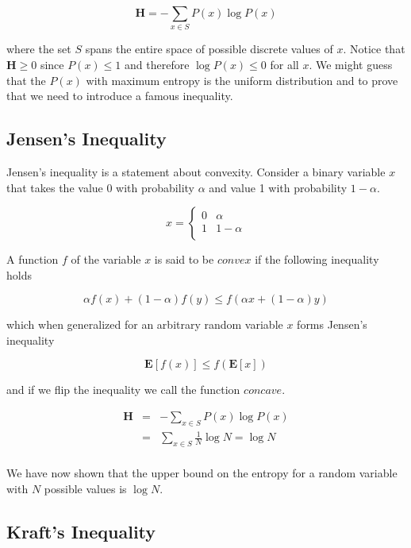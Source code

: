 \documentclass[a4paper,11pt]{book}
\begin{document}
\begin{equation}
\textbf{H} = -\sum_{x\in S} P(x)\log P(x)
\end{equation}

where the set $S$ spans the entire space of possible discrete values of $x$. Notice that $\mathbf{H} \geq 0$ since $P(x) \leq 1$ and therefore $\log P(x) \leq 0$  for all $x$. We might guess that the $P(x)$ with maximum entropy is the uniform distribution and to prove that we need to introduce a famous inequality.

\subsection{Jensen's Inequality}

Jensen's inequality is a statement about convexity. Consider a binary variable $x$ that takes the value 0 with probability $\alpha$ and value 1 with probability $1-\alpha$.

\[x= \begin{cases} 
      0 & \alpha \\
      1 & 1-\alpha \\
   \end{cases}
\]

A function $f$ of the variable $x$ is said to be $\textit{convex}$ if the following inequality holds

\begin{equation*}
\alpha f(x) + (1-\alpha)f(y) \leq f(\alpha x + (1-\alpha)y)
\end{equation*}

which when generalized for an arbitrary random variable $x$ forms Jensen's inequality

\begin{equation}
\mathbf{E}[f(x)] \leq f(\mathbf{E}[x])
\end{equation}

and if we flip the inequality we call the function $\textit{concave}$.

\begin{eqnarray*}
\textbf{H} &=& -\sum_{x\in S} P(x)\log P(x) \\
&=& \sum_{x\in S} \frac{1}{N}\log N  = \log N\\
\end{eqnarray*}

We have now shown that the upper bound on the entropy for a random variable with $N$ possible values is $\log N$.

\subsection{Kraft's Inequality}
\end{document}
